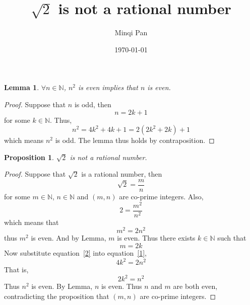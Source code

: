 \documentclass[11pt]{amsart}
\title{\(\sqrt{2}\) is not a rational number}
\author{Minqi Pan}
\date{\today}
\newtheorem*{lemma*}{Lemma}
\newtheorem*{proposition*}{Proposition}
\begin{document}
\maketitle

\begin{lemma*}
$\forall n\in \mathbb{N}$, $n^2$ is even implies that $n$ is even.
\end{lemma*}

\begin{proof}
Suppose that $n$ is odd, then
\[n=2k+1\]
for some $k\in \mathbb{N}$. Thus,
\[n^2=4k^2+4k+1=2(2k^2+2k)+1\]
which means $n^2$ is odd. The lemma thus holds by contraposition.
\end{proof}

\begin{proposition*}
\(\sqrt{2}\) is not a rational number.
\end{proposition*}

\begin{proof}
Suppose that \(\sqrt{2}\) is a rational number, then
\[\sqrt{2}=\frac{m}{n}\]
for some $m\in \mathbb{N}$, $n\in \mathbb{N}$ and $(m, n)$ are co-prime integers. Also,
\[2=\frac{m^2}{n^2}\]
which means that
\begin{equation} \label{1}
m^2=2n^2
\end{equation}
thus $m^2$ is even. And by Lemma, $m$ is even. Thus there exists $k\in \mathbb{N}$ such that
\begin{equation} \label{2}
m=2k
\end{equation}
Now substitute equation~\ref{2} into equation~\ref{1},
\[
4k^2=2n^2
\]
That is,
\[
2k^2=n^2
\]
Thus $n^2$ is even. By Lemma, $n$ is even. Thus $n$ and $m$ are both even, contradicting the proposition that $(m, n)$ are co-prime integers.
\end{proof}
\end{document}
